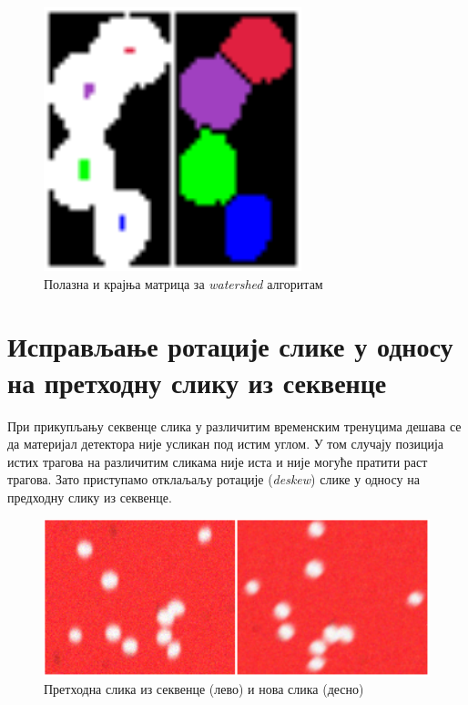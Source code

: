 \documentclass[12pt,a4paper,serbian,oneside]{book}
\begin{document}
\begin{figure}[htb]
\begin{center}
\includegraphics[width=75mm]{images/watershed.png}
\end{center}
\caption{Полазна и крајња матрица за \textit{watershed} алгоритам}
\label{fig:result}
\end{figure}

\section{Исправљање ротације слике у односу на претходну слику из секвенце}

При прикупљању секвенце слика у различитим временским тренуцима дешава се да материјал детектора није усликан под истим углом. У том случају позиција истих трагова на различитим сликама није иста и није могуће пратити раст трагова. Зато приступамо отклаљаљу ротације (\textit{deskew}) слике у односу на предходну слику из секвенце.

\begin{figure}
\begin{center}
\includegraphics[width=150mm]{images/prev+new.png}
\end{center}
\caption{Претходна слика из секвенце (лево) и нова слика (десно)}
\label{fig:otsu}
\end{figure}
\end{document}
